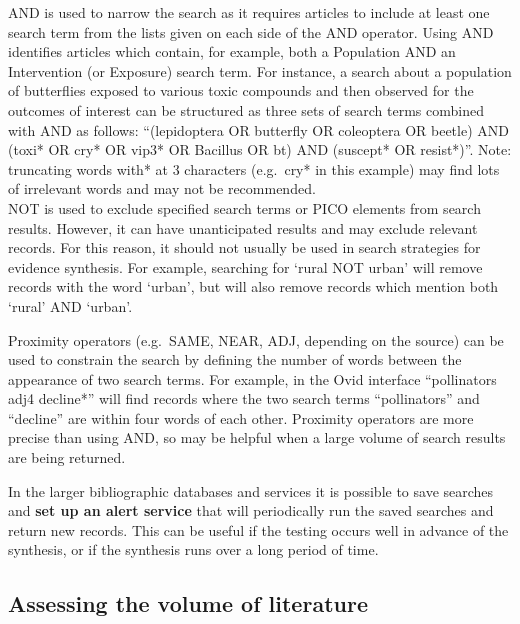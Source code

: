 \documentclass[
  letterpaper,
  DIV=11,
  numbers=noendperiod]{scrreprt}
\begin{document}
AND is used to narrow the search as it requires articles to include at
least one search term from the lists given on each side of the AND
operator. Using AND identifies articles which contain, for example, both
a Population AND an Intervention (or Exposure) search term. For
instance, a search about a population of butterflies exposed to various
toxic compounds and then observed for the outcomes of interest can be
structured as three sets of search terms combined with AND as follows:
``(lepidoptera OR butterfly OR coleoptera OR beetle) AND (toxi* OR cry*
OR vip3* OR Bacillus OR bt) AND (suscept* OR resist*)''. Note:
truncating words with* at 3 characters (e.g.~cry* in this example) may
find lots of irrelevant words and may not be recommended.\\
NOT is used to exclude specified search terms or PICO elements from
search results. However, it can have unanticipated results and may
exclude relevant records. For this reason, it should not usually be used
in search strategies for evidence synthesis. For example, searching for
`rural NOT urban' will remove records with the word `urban', but will
also remove records which mention both `rural' AND `urban'.

Proximity operators (e.g.~SAME, NEAR, ADJ, depending on the source) can
be used to constrain the search by defining the number of words between
the appearance of two search terms. For example, in the Ovid interface
``pollinators adj4 decline*'' will find records where the two search
terms ``pollinators'' and ``decline'' are within four words of each
other. Proximity operators are more precise than using AND, so may be
helpful when a large volume of search results are being returned.

In the larger bibliographic databases and services it is possible to
save searches and \textbf{set up an alert service} that will
periodically run the saved searches and return new records. This can be
useful if the testing occurs well in advance of the synthesis, or if the
synthesis runs over a long period of time.

\subsection{Assessing the volume of
literature}\label{assessing-the-volume-of-literature}
\end{document}
